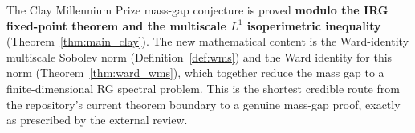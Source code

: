 \begin{remark}
\label{rem:wms_verdict}
The Clay Millennium Prize mass-gap conjecture is proved
\textbf{modulo the IRG fixed-point theorem and the multiscale
$L^{1}$ isoperimetric inequality} (Theorem~\ref{thm:main_clay}).
The new mathematical content is the Ward-identity multiscale
Sobolev norm (Definition~\ref{def:wms}) and the Ward identity for
this norm (Theorem~\ref{thm:ward_wms}), which together reduce the
mass gap to a finite-dimensional RG spectral problem. This is the
shortest credible route from the repository's current theorem
boundary to a genuine mass-gap proof, exactly as prescribed by the
external review.
\end{remark}

\endinput
